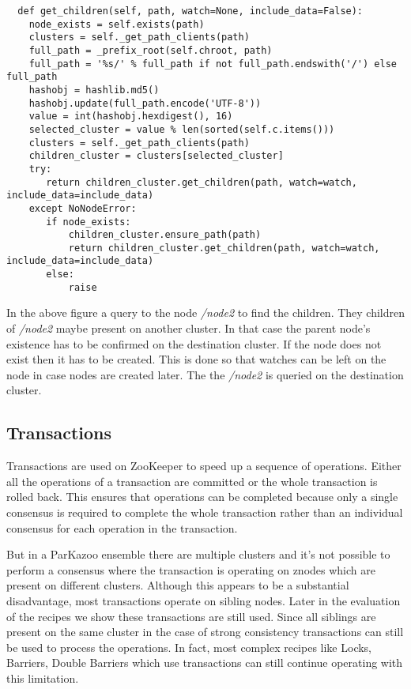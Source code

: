 \begin{lstlisting}
  def get_children(self, path, watch=None, include_data=False):
    node_exists = self.exists(path)
    clusters = self._get_path_clients(path)
    full_path = _prefix_root(self.chroot, path)
    full_path = '%s/' % full_path if not full_path.endswith('/') else full_path
    hashobj = hashlib.md5()
    hashobj.update(full_path.encode('UTF-8'))
    value = int(hashobj.hexdigest(), 16)
    selected_cluster = value % len(sorted(self.c.items()))
    clusters = self._get_path_clients(path)
    children_cluster = clusters[selected_cluster]
    try:
       return children_cluster.get_children(path, watch=watch, include_data=include_data)
    except NoNodeError:
       if node_exists:
           children_cluster.ensure_path(path)
           return children_cluster.get_children(path, watch=watch, include_data=include_data)
       else:
           raise
\end{lstlisting}



In the above figure a query to the node \textit{/node2} to find the children. They children of \textit{/node2} maybe present on another cluster. In that case the parent node's existence has to be confirmed on the destination cluster. If the node does not exist then it has to be created. This is done so that watches can be left on the node in case nodes are created later. The the \textit{/node2} is queried on the destination cluster.

\subsection{Transactions}
Transactions are used on ZooKeeper to speed up a sequence of operations. Either all the operations of a transaction are committed or the whole transaction is rolled back. This ensures that operations can be completed because only a single consensus is required to complete the whole transaction rather than an individual consensus for each operation in the transaction.
    
    But in a ParKazoo ensemble there are multiple clusters and it's not possible to perform a consensus where the transaction is operating on znodes which are present on different clusters. Although this appears to be a substantial disadvantage, most transactions operate on sibling nodes. Later in the evaluation of the recipes we show these transactions are still used. Since all siblings are present on the same cluster in the case of strong consistency transactions can still be used to process the operations. In fact, most complex recipes like Locks, Barriers, Double Barriers which use transactions can still continue operating with this limitation.
    
